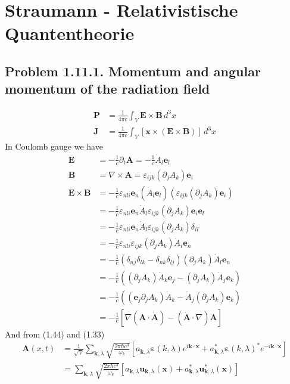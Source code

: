 \documentclass[../main.tex]{subfiles}
\begin{document}
\section{{\sc Straumann} - Relativistische Quantentheorie} 
\subsection{Problem 1.11.1. Momentum and angular momentum of the radiation field}

\begin{align}
\mathbf{P}&=\frac{1}{4\pi c}\int_V\mathbf{E}\times\mathbf{B}\,d^3x\\
\mathbf{J}&=\frac{1}{4\pi c}\int_V[\mathbf{x}\times(\mathbf{E}\times\mathbf{B})]\,d^3x
\end{align}
In Coulomb gauge we have
\begin{align}
\mathbf{E}&=-\frac{1}{c}\partial_t\mathbf{A}=-\frac{1}{c}\dot{A}_l\mathbf{e}_l\\
\mathbf{B}&=\nabla\times\mathbf{A}=\varepsilon_{ijk}(\partial_jA_k)\mathbf{e}_i\\
\mathbf{E}\times\mathbf{B}
&=-\frac{1}{c}\varepsilon_{nli}\mathbf{e}_n(\dot{A}_l\mathbf{e}_l)(\varepsilon_{ijk}(\partial_jA_k)\mathbf{e}_i)\\
&=-\frac{1}{c}\varepsilon_{nli}\mathbf{e}_n\dot{A}_l\varepsilon_{ijk}(\partial_jA_k)\mathbf{e}_i\mathbf{e}_l\\
&=-\frac{1}{c}\varepsilon_{nli}\mathbf{e}_n\dot{A}_l\varepsilon_{ijk}(\partial_jA_k)\delta_{il}\\
&=-\frac{1}{c}\varepsilon_{nli}\varepsilon_{ijk}(\partial_jA_k)\dot{A}_i\mathbf{e}_n\\
&=-\frac{1}{c}(\delta_{nj}\delta_{lk}-\delta_{nk}\delta_{lj})(\partial_jA_k)\dot{A}_l\mathbf{e}_n\\
&=-\frac{1}{c}((\partial_jA_k)\dot{A}_k\mathbf{e}_j-(\partial_jA_k)\dot{A}_j\mathbf{e}_k)\\
&=-\frac{1}{c}((\mathbf{e}_j\partial_jA_k)\dot{A}_k-\dot{A}_j(\partial_jA_k)\mathbf{e}_k)\\
&=-\frac{1}{c}[\nabla(\mathbf{A}\cdot\dot{\mathbf{A}})-(\dot{\mathbf{A}}\cdot\nabla)\mathbf{A}]
\end{align}
And from (1.44) and (1.33)
\begin{align}
\mathbf{A}(x,t)&=\frac{1}{\sqrt{V}}\sum_{\mathbf{k},\lambda}\sqrt{\frac{2\pi\hbar c^3}{\omega_k}}\left[
a_{\mathbf{k},\lambda}\boldsymbol{\varepsilon}(k,\lambda)e^{i\mathbf{k}\cdot\mathbf{x}}
+a^*_{\mathbf{k},\lambda}\boldsymbol{\varepsilon}(k,\lambda)^*e^{-i\mathbf{k}\cdot\mathbf{x}}\right]\\
&=\sum_{\mathbf{k},\lambda}\sqrt{\frac{2\pi\hbar c^3}{\omega_k}}\left[
a_{\mathbf{k},\lambda}\mathbf{u}_{\mathbf{k},\lambda}(\mathbf{x})
+a^*_{\mathbf{k},\lambda}\mathbf{u}^*_{\mathbf{k},\lambda}(\mathbf{x})\right]\\
\end{align}
\end{document}
